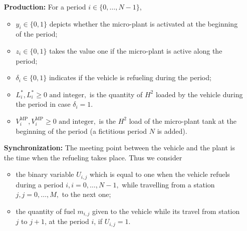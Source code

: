 \documentclass[11pt]{article}
\theoremstyle{plain}%
\theoremstyle{definition} \newtheorem{lem}{Lemma}[section]
\theoremstyle{definition} \newtheorem{claim}{Claim}[lem]
\theoremstyle{definition} \newtheorem{theorem}{Theorem}[section]
\theoremstyle{definition} \newtheorem{exo}{Exercice n$^\circ$}
\theoremstyle{definition} \newtheorem{quest}{}[exo]
\theoremstyle{definition} \newtheorem{sousquest}{}[quest]
\theoremstyle{remark}
\theoremstyle{definition}
\begin{document}
\begin{enumerate}
%
\item [\bf Production:]
For a period $i \in \{0, \ldots, N-1 \}$, 
\begin{itemize}
\item $y_i \in \{ 0, 1 \}$ depicts whether the micro-plant is activated at the beginning of the period;
\item $ z_i \in \{ 0, 1 \}$ takes the value one if the micro-plant is active along the period;
\item $ \delta_i \in \{0, 1\} $ indicates if the vehicle is refueling during the period;
\item $ L^*_i, L^*_i \geq 0 \textrm{ and integer}, $ is the quantity of $H^2$ loaded by the vehicle during the period in case $\delta_i = 1$.
\item $ V^{\textrm{MP}}_i, V^{\textrm{MP}}_i \geq 0 \textrm{ and integer},$ is the $H^2$ load of the micro-plant tank at the beginning of the period (a fictitious period $N$ is added).

\end{itemize}
\item [\bf Synchronization:]
The meeting point between the vehicle and the plant is the time when the refueling takes place. Thus
we consider
\begin{itemize}
\item the binary variable $U_{i,j}$ which is equal to one  when the vehicle refuels during a period $i, i=0, \ldots, N-1,$ while travelling from a station 
$j, j = 0,\ldots, M, $ to the next one;
\item  the quantity of fuel $m_{i,j}$ given to the vehicle while its travel from station $j$ to $j+1$, at
the period $i$, if $U_{i,j} = 1$.
\end{itemize}
\end{enumerate}
\end{document}
